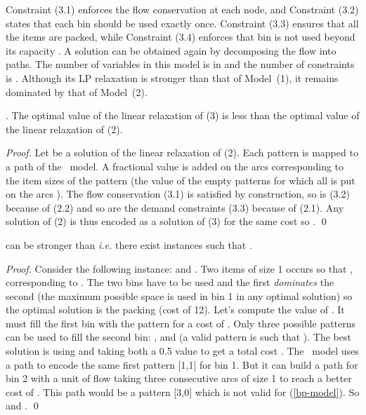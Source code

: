 Constraint (3.1) enforces the flow conservation at each node, and Constraint (3.2) states that each bin should be used exactly once. Constraint (3.3) ensures that all the items are packed, while Constraint (3.4) enforces that bin  is not used beyond its capacity . A solution can be obtained again by decomposing the flow into paths. The number of variables in this model is in  and the number of constraints is . Although its
LP  relaxation is stronger than that of Model~(1), it remains dominated by that of Model~(2).
\begin{proposition}. The optimal value of the linear relaxation of (3) is less than  the optimal value of the linear relaxation of (2). 
\end{proposition}
 \begin{proof} Let  be a solution of the linear relaxation of (2). Each pattern  is mapped to a path of the \arcflow\ model. A fractional value  is added on the arcs corresponding to the item sizes of the pattern (the value of the empty patterns for which all  is put on the arcs ). The flow conservation (3.1) is satisfied by construction, so is (3.2) because of (2.2) and so are the demand constraints (3.3) because of (2.1). Any solution of (2) is thus encoded as a solution of (3) for the same cost so . \qed
 \end{proof}


\begin{proposition}  can be stronger than  \emph{i.e.} there exist instances such that .  
\end{proposition}

 \begin{proof} Consider the following instance:  and . Two items of size 1 occurs so that ,  corresponding to . The two  bins have to be used and the first \emph{dominates} the second (the maximum possible space is used in bin 1 in any optimal solution) so the optimal solution is the packing  (cost of 12). Let's compute the value of . It must fill the first bin  with the pattern  for a cost of . Only three possible patterns can be used to fill the second bin: ,  and  (a valid pattern  is such that ). The best solution is using  and  taking both a 0.5 value to get a total cost . The \arcflow\ model uses a path to encode the same first pattern [1,1] for bin 1. But it can build a path for bin 2 with a  unit of flow taking three consecutive arcs of size 1 to reach a better cost of . This path would be a pattern [3,0] which is not valid for (\ref{bp-model}). So  and . 
 \qed
 \end{proof}


